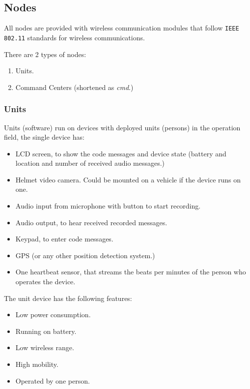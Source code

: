 \subsection{Nodes}
All nodes are provided with wireless communication modules that follow \texttt{IEEE 802.11} standards for wireless communications.

There are 2 types of nodes:
\begin{enumerate}[itemsep=1pt, topsep=5pt]
    \item Units.
    \item Command Centers (shortened as \textit{\acrshort{cmd}}.)
\end{enumerate}

\subsubsection{Units}
\label{subsubsec:units-dev}
Units (software) run on devices with deployed units (persons) in the operation field, the single device has:
\begin{itemize}[itemsep=1pt, topsep=5pt]
    \item LCD screen, to show the code messages and device state (battery and location and number of received audio messages.)
    \item Helmet video camera. Could be mounted on a vehicle if the device runs on one.
    \item Audio input from microphone with button to start recording.
    \item Audio output, to hear received recorded messages.
    \item Keypad, to enter code messages.
    \item GPS (or any other position detection system.)
    \item One heartbeat sensor, that streams the beats per minutes of the person who operates the device.
\end{itemize}

The unit device has the following features:
\begin{itemize}[itemsep=1pt, topsep=5pt]
    \item Low power consumption.
    \item Running on battery.
    \item Low wireless range.
    \item High mobility.
    \item Operated by one person.
\end{itemize}


